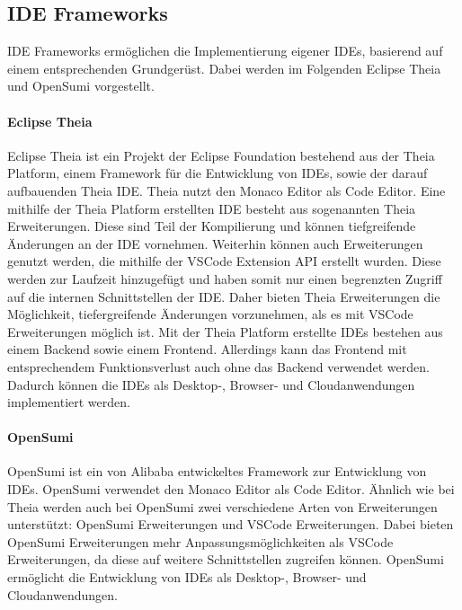 \subsection{IDE Frameworks}\label{section:stand-der-technik:weitere-entwicklungen:ide-frameworks}

IDE Frameworks ermöglichen die Implementierung eigener IDEs, basierend auf einem entsprechenden Grundgerüst. Dabei werden im Folgenden Eclipse Theia \cite{noauthor_theia_nodate} und OpenSumi \cite{noauthor_opensumi_nodate} vorgestellt.

\paragraph{Eclipse Theia}
Eclipse Theia \cite{noauthor_theia_nodate} ist ein Projekt der Eclipse Foundation \cite{milinkovich_eclipse-foundation_nodate} bestehend aus der Theia Platform, einem Framework für die Entwicklung von IDEs, sowie der darauf aufbauenden Theia IDE. Theia nutzt den Monaco Editor \cite{noauthor_monaco_nodate} als Code Editor. Eine mithilfe der Theia Platform erstellten IDE besteht aus sogenannten Theia Erweiterungen. Diese sind Teil der Kompilierung und können tiefgreifende Änderungen an der IDE vornehmen. Weiterhin können auch Erweiterungen genutzt werden, die mithilfe der VSCode Extension API \cite{noauthor_vscode-extension-api_nodate} erstellt wurden. Diese werden zur Laufzeit hinzugefügt und haben somit nur einen begrenzten Zugriff auf die internen Schnittstellen der IDE. Daher bieten Theia Erweiterungen die Möglichkeit, tiefergreifende Änderungen vorzunehmen, als es mit VSCode Erweiterungen möglich ist. Mit der Theia Platform erstellte IDEs bestehen aus einem Backend sowie einem Frontend. Allerdings kann das Frontend mit entsprechendem Funktionsverlust auch ohne das Backend verwendet werden. Dadurch können die IDEs als Desktop-, Browser- und Cloudanwendungen implementiert werden.

\paragraph{OpenSumi}
OpenSumi \cite{noauthor_opensumi_nodate} ist ein von Alibaba \cite{noauthor_alibaba_nodate} entwickeltes Framework zur Entwicklung von IDEs. OpenSumi verwendet den Monaco Editor \cite{noauthor_monaco_nodate} als Code Editor. Ähnlich wie bei Theia werden auch bei OpenSumi zwei verschiedene Arten von Erweiterungen unterstützt: OpenSumi Erweiterungen und VSCode Erweiterungen. Dabei bieten OpenSumi Erweiterungen mehr Anpassungsmöglichkeiten als VSCode Erweiterungen, da diese auf weitere Schnittstellen zugreifen können. OpenSumi ermöglicht die Entwicklung von IDEs als Desktop-, Browser- und Cloudanwendungen.

